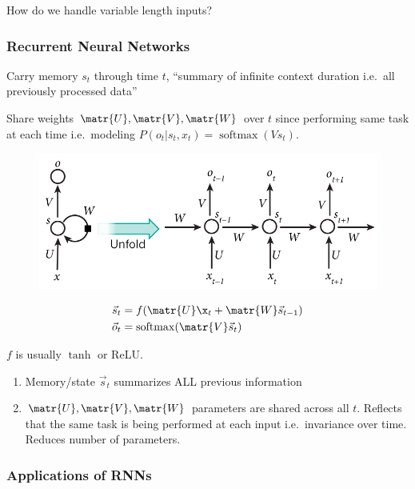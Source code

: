 \documentclass[a4paper,oneside,reqno,onecolumn]{amsart}
\newcommand{\U}{\matr{U}}
\newcommand{\V}{\matr{V}}
\newcommand{\W}{\matr{W}}
\newcommand{\s}{\vec{s}}
\renewcommand{\o}{\vec{o}}
\DeclareMathOperator*{\softmax}{softmax}
\begin{document}
How do we handle variable length inputs?

\subsubsection{Recurrent Neural Networks}

Carry memory $s_t$ through time $t$, ``summary of infinite context duration
i.e.\ all previously processed data''

Share weights $\matr{U}, \matr{V}, \matr{W}$ over $t$ since performing same
task at each time i.e.\ modeling $P(o_t | s_t, x_t) = \softmax(V s_t)$.

\begin{figure}[htpb]
    \centering
    \includegraphics[width=0.8\linewidth]{Figures/rnn.jpg}
    \caption{}
\end{figure}

\begin{align}
    \s_t &= f(\U \x_t + \W \s_{t-1}) \\
    \o_t &= \softmax( \V \s_t)
\end{align}

$f$ is usually $\tanh$ or ReLU.

\begin{enumerate}
    \item Memory/state $\s_t$ summarizes ALL previous information
    \item $\U, \V, \W$ parameters are shared across all $t$. Reflects
        that the same task is being performed at each input i.e.\
        invariance over time. Reduces number of parameters.
\end{enumerate}

\subsubsection{Applications of RNNs}
\end{document}
